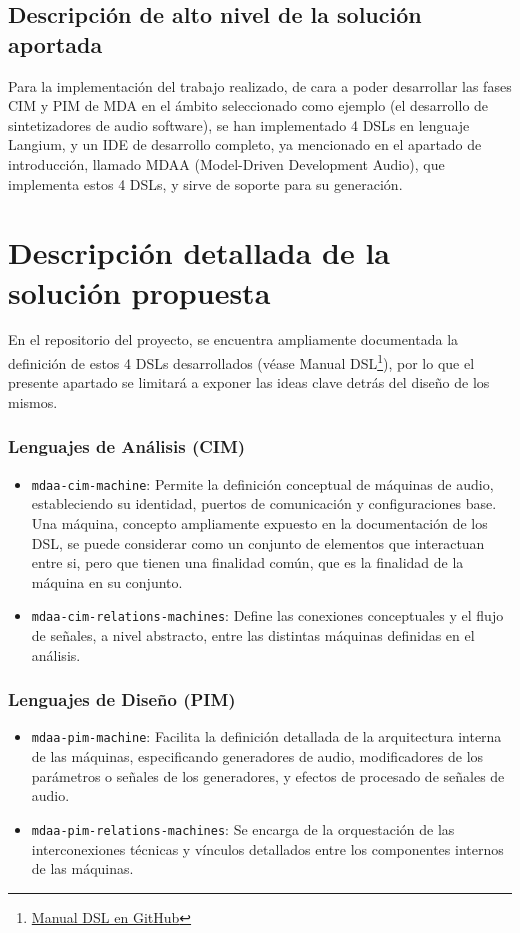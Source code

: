 
\subsection{Descripción de alto nivel de la solución aportada}

Para la implementación del trabajo realizado, de cara a poder desarrollar las fases CIM y PIM de MDA en el ámbito seleccionado como ejemplo (el desarrollo de sintetizadores de audio software), se han implementado 4 DSLs en lenguaje Langium, y un IDE de desarrollo completo, ya mencionado en el apartado de introducción, llamado MDAA (Model-Driven Development Audio), que implementa estos 4 DSLs, y sirve de soporte para su generación.


\section{Descripción detallada de la solución propuesta}

En el repositorio del proyecto, se encuentra ampliamente documentada la definición de estos 4 DSLs desarrollados (véase Manual DSL\footnote{\href{\urlProyectoManualDsl}{Manual DSL en GitHub}}), por lo que el presente apartado se limitará a exponer las ideas clave detrás del diseño de los mismos.

\subsubsection*{Lenguajes de Análisis (CIM)}
\begin{itemize}
    \item \texttt{mdaa-cim-machine}: Permite la definición conceptual de máquinas de audio, estableciendo su identidad, puertos de comunicación y configuraciones base. Una máquina, concepto ampliamente expuesto en la documentación de los DSL, se puede considerar como un conjunto de elementos que interactuan entre si, pero que tienen una finalidad común, que es la finalidad de la máquina en su conjunto.
    \item \texttt{mdaa-cim-relations-machines}: Define las conexiones conceptuales y el flujo de señales, a nivel abstracto, entre las distintas máquinas definidas en el análisis.
\end{itemize}

\subsubsection*{Lenguajes de Diseño (PIM)}
\begin{itemize}
    \item \texttt{mdaa-pim-machine}: Facilita la definición detallada de la arquitectura interna de las máquinas, especificando generadores de audio, modificadores de los parámetros o señales de los generadores, y efectos de procesado de señales de audio.
    \item \texttt{mdaa-pim-relations-machines}: Se encarga de la orquestación de las interconexiones técnicas y vínculos detallados entre los componentes internos de las máquinas.
\end{itemize}

